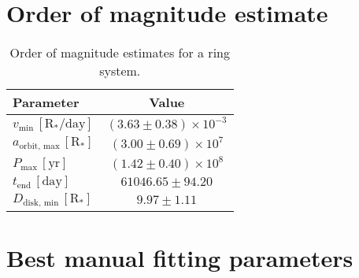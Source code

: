 \documentclass[letter]{aa} %
\begin{document}
\begin{appendix}

\section{Order of magnitude estimate}

\begin{table}[ht]
    \centering
    \caption{Order of magnitude estimates for a ring system.}
    \begin{tabular}{lc}
        \hline
        \textbf{Parameter} & \textbf{Value}\\
        \hline
        \hline
        $v_{\ensuremath{\mathrm{min}}} \, [{\ensuremath{\mathrm{R_*/\ensuremath{\mathrm{day}}}}}]$ & $(3.63\pm0.38)\times10^{-3}$\\
        $a_{\ensuremath{\mathrm{orbit, \,max}}} \,[{\ensuremath{\mathrm{R_*}}}]$ & $(3.00\pm0.69)\times10^7$\\
        $P_{\ensuremath{\mathrm{max}}} \, [\ensuremath{\mathrm{yr}}]$ & $(1.42\pm0.40)\times10^8$\\
        $t_{\ensuremath{\mathrm{end}}} \, [\ensuremath{\mathrm{day}}]$ & $61046.65\pm94.20$\\
        $D_{\ensuremath{\mathrm{disk, \,min}}} \,[{\ensuremath{\mathrm{R_*}}}]$ & $9.97\pm1.11$\\
        \hline
    \end{tabular}
    \label{tab:derived_param_steep_grad}
\end{table}

\section{Best manual fitting parameters}


\end{appendix}
\end{document}
